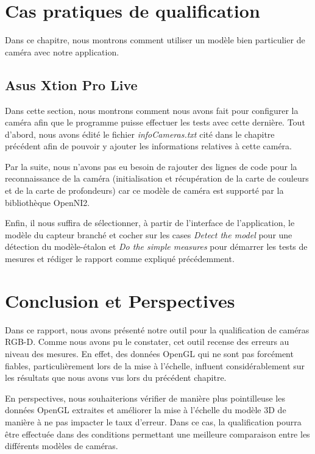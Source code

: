 \documentclass[a4paper, 12pt]{book}
\newcounter{program}[subsection]
\begin{document}
\chapter{Cas pratiques de qualification}
Dans ce chapitre, nous montrons comment utiliser un modèle bien particulier de caméra avec notre application.
\section{Asus Xtion Pro Live}
Dans cette section, nous montrons comment nous avons fait pour configurer la caméra afin que le programme puisse effectuer les tests avec cette dernière.
Tout d'abord, nous avons édité le fichier \emph{infoCameras.txt} cité dans le chapitre précédent afin de pouvoir y ajouter les informations relatives à cette caméra.
\par Par la suite, nous n'avons pas eu besoin de rajouter des lignes de code pour la reconnaissance de la caméra (initialisation et récupération de la carte de couleurs et de la carte de profondeurs) car ce modèle de caméra est supporté par la bibliothèque OpenNI2.
\par Enfin, il nous suffira de sélectionner, à partir de l'interface de l'application, le modèle du capteur branché et cocher sur les cases \emph{Detect the model} pour une détection du modèle-étalon et \emph{Do the simple measures} pour démarrer les tests de mesures et rédiger le rapport comme expliqué précédemment.
\chapter{Conclusion et Perspectives\label{chap-conclusion}}
\par Dans ce rapport, nous avons présenté notre outil pour la qualification de caméras RGB-D. Comme nous avons pu le constater, cet outil recense des erreurs au niveau des mesures. En effet, des données OpenGL qui ne sont pas forcément fiables, particulièrement lors de la mise à l'échelle, influent considérablement sur les résultats que nous avons vus lors du précédent chapitre.
\par En perspectives, nous souhaiterions vérifier de manière plus pointilleuse les données OpenGL extraites et améliorer la mise à l'échelle du modèle 3D de manière à ne pas impacter le taux d'erreur.
Dans ce cas, la qualification pourra être effectuée dans des conditions permettant une meilleure comparaison entre les différents modèles de caméras.  

\nocite{*}
%	
%
\printbibliography
\end{document}
